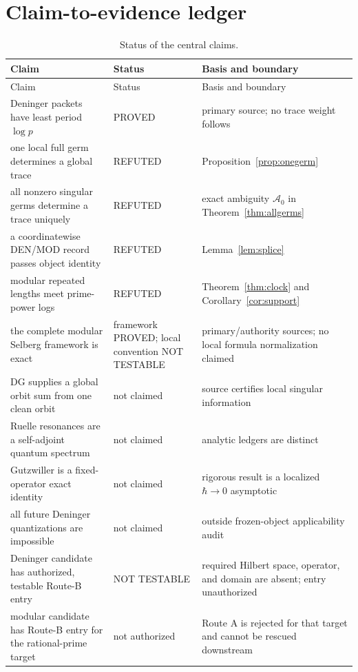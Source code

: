 \documentclass[11pt]{article}
\theoremstyle{definition}
\theoremstyle{remark}
\newcommand{\proved}{\textsf{PROVED}\xspace}
\newcommand{\nottest}{\textsf{NOT TESTABLE}\xspace}
\newcommand{\refuted}{\textsf{REFUTED}\xspace}
\begin{document}
\appendix
\section{Claim-to-evidence ledger}

\begin{longtable}{P{0.38\textwidth}P{0.18\textwidth}P{0.34\textwidth}}
\caption{Status of the central claims.}\label{tab:claims}\\
\toprule
Claim & Status & Basis and boundary\\
\midrule
\endfirsthead
\toprule
Claim & Status & Basis and boundary\\
\midrule
\endhead
Deninger packets have least period \(\log p\) & \proved & primary source; no trace weight follows\\
one local full germ determines a global trace & \refuted & Proposition~\ref{prop:onegerm}\\
all nonzero singular germs determine a trace uniquely & \refuted & exact ambiguity \(\mathcal A_0\) in Theorem~\ref{thm:allgerms}\\
a coordinatewise DEN/MOD record passes object identity & \refuted & Lemma~\ref{lem:splice}\\
modular repeated lengths meet prime-power logs & \refuted & Theorem~\ref{thm:clock} and Corollary~\ref{cor:support}\\
the complete modular Selberg framework is exact & framework \proved; local convention \nottest & primary/authority sources; no local formula normalization claimed\\
DG supplies a global orbit sum from one clean orbit & not claimed & source certifies local singular information\\
Ruelle resonances are a self-adjoint quantum spectrum & not claimed & analytic ledgers are distinct\\
Gutzwiller is a fixed-operator exact identity & not claimed & rigorous result is a localized \(\hbar\to0\) asymptotic\\
all future Deninger quantizations are impossible & not claimed & outside frozen-object applicability audit\\
Deninger candidate has authorized, testable Route-B entry & \nottest & required Hilbert space, operator, and domain are absent; entry unauthorized\\
modular candidate has Route-B entry for the rational-prime target & not authorized & Route A is rejected for that target and cannot be rescued downstream\\
\bottomrule
\end{longtable}
\end{document}
